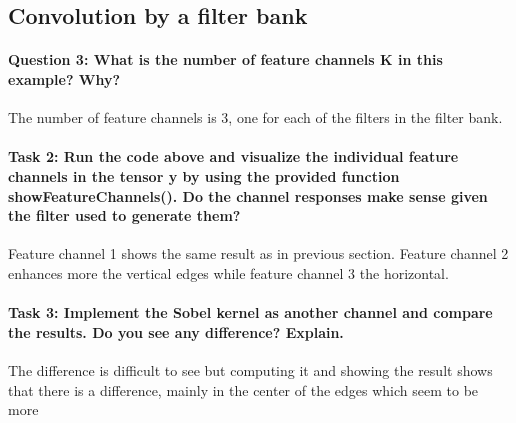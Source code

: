 \documentclass[12pt]{article}
\begin{document}
\subsection{Convolution by a filter bank}
\paragraph{Question 3: What is the number of feature channels K in this example? Why?} The number of feature channels is 3, one for each of the filters in the filter bank.
\paragraph{Task 2: Run the code above and visualize the individual feature channels in the tensor y by using the provided function showFeatureChannels(). Do the channel responses make sense given the
filter used to generate them?} Feature channel 1 shows the same result as in previous section. Feature channel 2 enhances more the vertical edges while feature channel 3 the horizontal.
\paragraph{Task 3: Implement the Sobel kernel as another channel and compare the results. Do you see any difference? Explain.} The difference is difficult to see but computing it and showing the result shows that there is a difference, mainly in the center of the edges which seem to be more 
\end{document}
